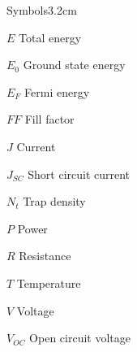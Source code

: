 \begin{mclistof}{Symbols}{3.2cm}
\vspace{\frontmatterbaselineskip}

\item[$E$] Total energy
\item[$E_0$] Ground state energy
\item[$E_F$] Fermi energy
\item[$FF$] Fill factor
\item[$J$] Current
\item[$J_{SC}$] Short circuit current
\item[$N_t$] Trap density
\item[$P$] Power
\item[$R$] Resistance
\item[$T$] Temperature
\item[$V$] Voltage
\item[$V_{OC}$] Open circuit voltage


\end{mclistof} 